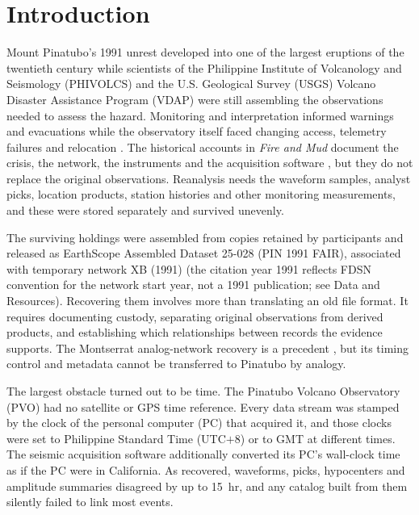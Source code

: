 \documentclass[linenum]{SSA-SRL}
\begin{document}
\maketitle

\section{Introduction}

Mount Pinatubo's 1991 unrest developed into one of the largest eruptions of the twentieth century while scientists of the Philippine Institute of Volcanology and Seismology (PHIVOLCS) and the U.S. Geological Survey (USGS) Volcano Disaster Assistance Program (VDAP) were still assembling the observations needed to assess the hazard. Monitoring and interpretation informed warnings and evacuations while the observatory itself faced changing access, telemetry failures and relocation \citep{Harlow_1996,Wolfe_1996}. The historical accounts in \textit{Fire and Mud} document the crisis, the network, the instruments and the acquisition software \citep{Newhall_1996}, but they do not replace the original observations. Reanalysis needs the waveform samples, analyst picks, location products, station histories and other monitoring measurements, and these were stored separately and survived unevenly.

The surviving holdings were assembled from copies retained by participants and released as EarthScope Assembled Dataset 25-028 (PIN 1991 FAIR), associated with temporary network XB (1991) \citep{XB_1991} (the citation year 1991 reflects FDSN convention for the network start year, not a 1991 publication; see Data and Resources). Recovering them involves more than translating an old file format. It requires documenting custody, separating original observations from derived products, and establishing which relationships between records the evidence supports. The Montserrat analog-network recovery is a precedent \citep{Thompson_2020}, but its timing control and metadata cannot be transferred to Pinatubo by analogy.

The largest obstacle turned out to be time. The Pinatubo Volcano Observatory (PVO) had no satellite or GPS time reference. Every data stream was stamped by the clock of the personal computer (PC) that acquired it, and those clocks were set to Philippine Standard Time (UTC$+$8) or to GMT at different times. The seismic acquisition software additionally converted its PC's wall-clock time as if the PC were in California. As recovered, waveforms, picks, hypocenters and amplitude summaries disagreed by up to 15~hr, and any catalog built from them silently failed to link most events.
\end{document}
